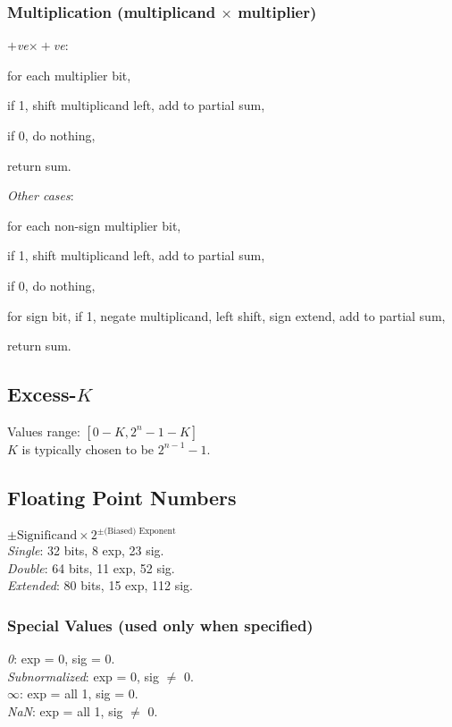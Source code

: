 \subsubsection*{Multiplication (multiplicand $\times$ multiplier)}
\emph{$+$ve$\times+$ve}: \begin{enumerate*}[label=(\arabic*)]
    \item for each multiplier bit,
    \item if 1, shift multiplicand left, add to partial sum,
    \item if 0, do nothing,
    \item return sum.
\end{enumerate*}
\emph{Other cases}: \begin{enumerate*}[label=(\arabic*)]
    \item for each non-sign multiplier bit,
    \item if 1, shift multiplicand left, add to partial sum,
    \item if 0, do nothing,
    \item for sign bit, if 1, negate multiplicand, left shift, sign extend, add to partial sum,
    \item return sum.
\end{enumerate*}

\subsection*{Excess-$K$}
Values range: $[0-K, 2^n-1-K]$\\
$K$ is typically chosen to be $2^{n-1} - 1$.

\subsection*{Floating Point Numbers}
$\pm\text{Significand}\times2^{\pm\text{(Biased) Exponent}}$\\
\emph{Single}: 32 bits, 8 exp, 23 sig.\\
\emph{Double}: 64 bits, 11 exp, 52 sig.\\
\emph{Extended}: 80 bits, 15 exp, 112 sig.

\subsubsection*{Special Values (used only when specified)}
\emph{0}: exp = 0, sig = 0.\\
\emph{Subnormalized}: exp = 0, sig $\neq$ 0.\\
\emph{$\boldsymbol{\infty}$}: exp = all 1, sig = 0.\\
\emph{NaN}: exp = all 1, sig $\neq$ 0.

